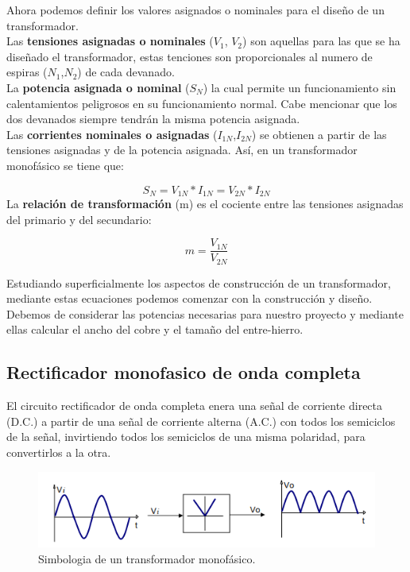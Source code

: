 Ahora podemos definir los valores asignados o nominales para el diseño de un transformador.\\

Las \textbf{tensiones asignadas o nominales} ($V_{1}$, $V_{2}$) son aquellas para las que se ha diseñado el transformador, estas tenciones son proporcionales al numero de espiras ($N_{1}$,$N_{2}$) de cada devanado.\\

La \textbf{potencia asignada o nominal} ($S_{N}$) la cual permite un funcionamiento sin calentamientos peligrosos en su funcionamiento normal. Cabe mencionar que los dos devanados siempre tendrán la misma potencia asignada.\\

Las \textbf{corrientes nominales o asignadas} ($I_{1N}$,$I_{2N}$) se obtienen a partir de las tensiones asignadas y de la potencia asignada. Así, en un transformador monofásico se tiene que:

\begin{equation}\label{eq:ej}
S_{N}=V_{1N}*I_{1N}=V_{2N}*I_{2N}
\end{equation}
La \textbf{relación de transformación} (m) es el cociente entre las tensiones asignadas del primario y del secundario: 

\begin{equation}\label{eq:ej}
m=\dfrac{V_{1N}}{V_{2N}}
\end{equation}

Estudiando superficialmente los aspectos de construcción de un transformador, mediante estas ecuaciones podemos comenzar con la construcción y diseño. Debemos de considerar las potencias necesarias para nuestro proyecto y mediante ellas calcular el ancho del cobre y el tamaño del entre-hierro.\cite{transformador}
\newpage

\subsection{Rectificador monofasico de onda completa}

El circuito rectificador de onda completa enera una señal de corriente directa (D.C.) a partir de una señal de corriente alterna
(A.C.) con todos los semiciclos de la señal, invirtiendo todos los semiciclos de una misma polaridad, para convertirlos a la otra. 

\begin{figure}[H]
\centering
\includegraphics[width=12cm]{capitulo3/figs/puente.png}
\caption{ Simbologia de un transformador monofásico.}
\end{figure}

